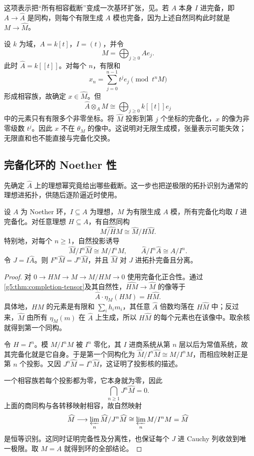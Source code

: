 这项表示把“所有相容截断”变成一次基环扩张，见\cite[第8节，定理8.7，第60页]{Matsumura1989}。若 \(A\) 本身 \(I\) 进完备，即 \(A\to\widehat A\) 是同构，则每个有限生成 \(A\) 模也完备，因为上述自然同构此时就是 \(M\to\widehat M\)。

\begin{example}\label{g5:exm:completion-infinite-direct-sum}
	设 \(k\) 为域，\(A=k[t]\)，\(I=(t)\)，并令
	\[
		M=\bigoplus_{j\geq0}Ae_j.
	\]
	此时 \(\widehat A=k[[t]]\)。对每个 \(n\)，有限和
	\[
		x_n=\sum_{j=0}^{n-1}t^je_j\pmod{t^nM}
	\]
	形成相容族，故确定 \(x\in\widehat M\)。但
	\[
		\widehat A\otimes_A M\cong\bigoplus_{j\geq0}k[[t]]e_j
	\]
	中的元素只有有限多个非零坐标。将 \(\widehat M\) 投影到第 \(j\) 个坐标的完备化，\(x\) 的像为非零级数 \(t^j\)。因此 \(x\) 不在 \(\theta_M\) 的像中。这说明对无限生成模，张量表示可能失效；无限直和也不能直接与完备化交换。
\end{example}

\subsection{完备化环的 Noether 性}
\label{g5:subsec:0703:04}

先确定 \(\widehat A\) 上的理想幂究竟给出哪些截断。这一步也把逆极限的拓扑识别为通常的理想进拓扑，供随后逐阶逼近时使用。

\begin{proposition}\label{g5:prop:completion-quotient}
	设 \(A\) 为 Noether 环，\(I\subseteq A\) 为理想，\(M\) 为有限生成 \(A\) 模，所有完备化均取 \(I\) 进完备化。对任意理想 \(H\subseteq A\)，有自然同构
	\[
		\widehat{M/HM}\cong\widehat M/H\widehat M.
	\]
	特别地，对每个 \(n\geq1\)，自然投影诱导
	\[
		\widehat M/I^n\widehat M\cong M/I^nM,
		\qquad
		\widehat A/I^n\widehat A\cong A/I^n.
	\]
	令 \(J=I\widehat A\)。则 \(F^n\widehat M=J^n\widehat M\)，并且 \(\widehat M\) 对 \(J\) 进拓扑完备且分离。
\end{proposition}
\begin{proof}
	对 \(0\to HM\to M\to M/HM\to0\) 使用完备化正合性。通过\cref{g5:thm:completion-tensor}及其自然性，\(\widehat{HM}\to\widehat M\) 的像等于
	\[
		\widehat A\cdot\eta_M(HM)=H\widehat M.
	\]
	具体地，\(HM\) 的元素是有限和 \(\sum_i h_im_i\)，其任意 \(\widehat A\) 倍数均落在 \(H\widehat M\) 中；反过来，\(\widehat M\) 由所有 \(\eta_M(m)\) 在 \(\widehat A\) 上生成，所以 \(H\widehat M\) 的每个元素也在该像中。取余核就得到第一个同构。

	令 \(H=I^n\)。模 \(M/I^nM\) 被 \(I^n\) 零化，其 \(I\) 进商系统从第 \(n\) 层以后为常值系统，故其完备化就是它自身。于是第一个同构化为
	\(\widehat M/I^n\widehat M\cong M/I^nM\)，而相应映射正是第 \(n\) 个投影。又因
	\(J^n\widehat M=I^n\widehat M\)，这证明了投影核的描述。

	一个相容族若每个投影都为零，它本身就为零，因此
	\[
		\bigcap_{n\geq1}J^n\widehat M=0.
	\]
	上面的商同构与各转移映射相容，故自然映射
	\[
		\widehat M\longrightarrow
		\varprojlim_n\widehat M/J^n\widehat M
		\cong\varprojlim_n M/I^nM=\widehat M
	\]
	是恒等识别。这同时证明完备性及分离性，也保证每个 \(J\) 进 Cauchy 列收敛到唯一极限。取 \(M=A\) 就得到环的全部结论。
\end{proof}

